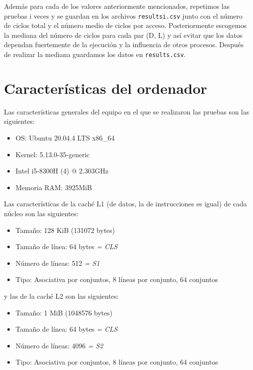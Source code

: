 \documentclass[a4paper,twocolumn]{article}
\begin{document}
	Además para cada de los valores anteriormente mencionados, repetimos las pruebas i veces y se guardan en los archivos \texttt{resultsi.csv} junto con el número de ciclos total y el número medio de ciclos por acceso. Posteriormente escogemos la mediana del número de ciclos para cada par (D, L) y así evitar que los datos dependan fuertemente de la ejecución y la influencia de otros procesos. Después de realizar la mediana guardamos los datos en \texttt{results.csv}.\par
	
	\section{Características del ordenador}
	Las características generales del equipo en el que se realizaron las pruebas son las siguientes:
	
	\begin{itemize}
        \item OS: Ubuntu 20.04.4 LTS x86\_64 
        \item Kernel: 5.13.0-35-generic 
        \item Intel i5-8300H (4) @ 2.303GHz
        \item Memoria RAM: 3925MiB
    \end{itemize}
    
    Las características de la caché L1 (de datos, la de instrucciones es igual) de cada núcleo son las siguientes:
    
	\begin{itemize}
        \item Tamaño: 128 KiB (131072 bytes)
        \item Tamaño de línea: 64 bytes \textit{= CLS}
        \item Número de líneas: 512 \textit{= S1}
        \item Tipo: Asociativa por conjuntos, 8 líneas por conjunto, 64 conjuntos
    \end{itemize}
    
    y las de la caché L2 son las siguientes: 
    
	\begin{itemize}
        \item Tamaño: 1 MiB (1048576 bytes)
        \item Tamaño de línea: 64 bytes \textit{= CLS}
        \item Número de líneas: 4096 \textit{= S2}
        \item Tipo: Asociativa por conjuntos, 8 líneas por conjunto, 64 conjuntos
    \end{itemize}
    
\end{document}
